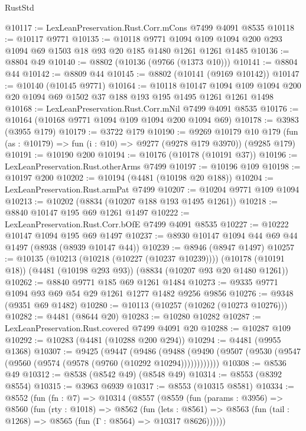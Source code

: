 \begin{lexlean}{RustStd}
\begin{coremodule}
@10117 := LexLeanPreservation.Rust.Corr.mCons @7499 @4091 @8535
@10118 := @10117 @9771
@10135 := @10118
    @9771
    @1094
    @109
    @1094
    @200
    @293
    @1094
    @69
    @1503
    @18
    @93
    @20
    @185
    @1480
    @1261
    @1261
    @1485
@10136 := @8804 @49
@10140 := @8802 (@10136 (@9766 (@1373 @10)))
@10141 := @8804 @44
@10142 := @8809 @44
@10145 := @8802 (@10141 (@9169 @10142))
@10147 := @10140 (@10145 @9771)
@10164 := @10118
    @10147
    @1094
    @109
    @1094
    @200
    @20
    @1094
    @69
    @1502
    @37
    @188
    @193
    @195
    @1495
    @1261
    @1261
    @1498
@10168 := LexLeanPreservation.Rust.Corr.mNil @7499 @4091 @8535
@10176 := @10164 (@10168 @9771 @1094 @109 @1094 @200 @1094 @69)
@10178 := @3983 (@3955 @179)
@10179 := @3722 @179
@10190 := @9269
    @10179
    @10
    @179
    (fun (as : @10179) => fun (i : @10) => @9277 (@9278 @179 @3970))
    (@9285 @179)
@10191 := @10190 @200
@10194 := @10176 (@10178 (@10191 @37))
@10196 := LexLeanPreservation.Rust.otherArms @7499
@10197 := @10196 @109
@10198 := @10197 @200
@10202 := @10194 (@4481 (@10198 @20 @188))
@10204 := LexLeanPreservation.Rust.armPat @7499
@10207 := @10204 @9771 @109 @1094
@10213 := @10202 (@8834 (@10207 @188 @193 @1495 @1261))
@10218 := @8840 @10147 @195 @69 @1261 @1497
@10222 := LexLeanPreservation.Rust.Corr.bOfE @7499 @4091 @8535
@10227 := @10222 @10147 @1094 @195 @69 @1497
@10237 := @8930 @10147 @1094 @44 @69 @44 @1497 (@8938 (@8939 @10147 @44))
@10239 := @8946 (@8947 @1497)
@10257 := @10135
    (@10213 (@10218 (@10227 (@10237 @10239))))
    (@10178 (@10191 @18))
    (@4481 (@10198 @293 @93))
    (@8834 (@10207 @93 @20 @1480 @1261))
@10262 := @8840 @9771 @185 @69 @1261 @1484
@10273 := @9335 @9771 @1094 @93 @69 @54 @29 @1261 @1277 @1482 @9256 @9856
@10276 := @9348 (@9351 @69 @1482)
@10280 := @10113 (@10257 (@10262 (@10273 @10276)))
@10282 := @4481 (@8644 @20)
@10283 := @10280 @10282
@10287 := LexLeanPreservation.Rust.covered @7499 @4091 @20
@10288 := @10287 @109
@10292 := @10283 (@4481 (@10288 @200 @294))
@10294 := @4481 (@9955 @1368)
@10307 := @9425
    (@9447
      (@9486
        (@9488 (@9490 (@9507 (@9530 (@9547 (@9560 (@9574 (@9578 (@9760 (@10292 @10294))))))))))))
@10308 := @8536 @49
@10312 := @8538 (@8542 @49) (@8548 @49)
@10314 := @8553 (@8392 @8554)
@10315 := @3963 @6939
@10317 := @8553 (@10315 @8581)
@10334 := @8552
    (fun (fn : @7) =>
    @10314
      (@8557
        (@8559
          (fun (params : @3956) =>
          @8560
            (fun (rty : @1018) =>
            @8562
              (fun (lets : @8561) =>
              @8563 (fun (tail : @1268) => @8565 (fun (Γ : @8564) => @10317 @8626))))))

\end{coremodule}
\end{lexlean}
